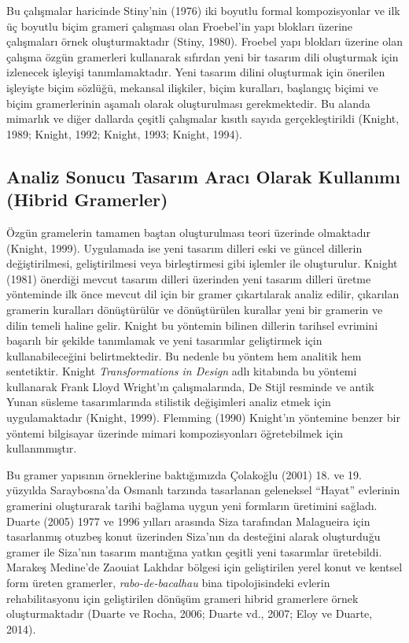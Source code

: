 \documentclass[12pt,turkish,a4paperpaper,]{report}
\begin{document}
Bu çalışmalar haricinde Stiny'nin (1976) iki boyutlu formal
kompozisyonlar ve ilk üç boyutlu biçim grameri çalışması olan Froebel'in
yapı blokları üzerine çalışmaları örnek oluşturmaktadır (Stiny, 1980).
Froebel yapı blokları üzerine olan çalışma özgün gramerleri kullanarak
sıfırdan yeni bir tasarım dili oluşturmak için izlenecek işleyişi
tanımlamaktadır. Yeni tasarım dilini oluşturmak için önerilen işleyişte
biçim sözlüğü, mekansal ilişkiler, biçim kuralları, başlangıç biçimi ve
biçim gramerlerinin aşamalı olarak oluşturulması gerekmektedir. Bu
alanda mimarlık ve diğer dallarda çeşitli çalışmalar kısıtlı sayıda
gerçekleştirildi (Knight, 1989; Knight, 1992; Knight, 1993; Knight,
1994).

\hypertarget{analiz-sonucu-tasarux131m-aracux131-olarak-kullanux131mux131-hibrid-gramerler}{%
\subsection{Analiz Sonucu Tasarım Aracı Olarak Kullanımı (Hibrid
Gramerler)}\label{analiz-sonucu-tasarux131m-aracux131-olarak-kullanux131mux131-hibrid-gramerler}}

Özgün gramelerin tamamen baştan oluşturulması teori üzerinde olmaktadır
(Knight, 1999). Uygulamada ise yeni tasarım dilleri eski ve güncel
dillerin değiştirilmesi, geliştirilmesi veya birleştirmesi gibi işlemler
ile oluşturulur. Knight (1981) önerdiği mevcut tasarım dilleri üzerinden
yeni tasarım dilleri üretme yönteminde ilk önce mevcut dil için bir
gramer çıkartılarak analiz edilir, çıkarılan gramerin kuralları
dönüştürülür ve dönüştürülen kurallar yeni bir gramerin ve dilin temeli
haline gelir. Knight bu yöntemin bilinen dillerin tarihsel evrimini
başarılı bir şekilde tanımlamak ve yeni tasarımlar geliştirmek için
kullanabileceğini belirtmektedir. Bu nedenle bu yöntem hem analitik hem
sentetiktir. Knight \emph{Transformations in Design} adlı kitabında bu
yöntemi kullanarak Frank Lloyd Wright'ın çalışmalarında, De Stijl
resminde ve antik Yunan süsleme tasarımlarında stilistik değişimleri
analiz etmek için uygulamaktadır (Knight, 1999). Flemming (1990)
Knight'ın yöntemine benzer bir yöntemi bilgisayar üzerinde mimari
kompozisyonları öğretebilmek için kullanmmıştır.

Bu gramer yapısının örneklerine baktığımızda Çolakoğlu (2001) 18. ve 19.
yüzyılda Saraybosna'da Osmanlı tarzında tasarlanan geleneksel ``Hayat''
evlerinin gramerini oluşturarak tarihi bağlama uygun yeni formların
üretimini sağladı. Duarte (2005) 1977 ve 1996 yılları arasında Siza
tarafından Malagueira için tasarlanmış otuzbeş konut üzerinden Siza'nın
da desteğini alarak oluşturduğu gramer ile Siza'nın tasarım mantığına
yatkın çeşitli yeni tasarımlar üretebildi. Marakeş Medine'de Zaouiat
Lakhdar bölgesi için geliştirilen yerel konut ve kentsel form üreten
gramerler, \emph{rabo-de-bacalhau} bina tipolojisindeki evlerin
rehabilitasyonu için geliştirilen dönüşüm grameri hibrid gramerlere
örnek oluşturmaktadır (Duarte ve Rocha, 2006; Duarte vd., 2007; Eloy ve
Duarte, 2014).
\end{document}
